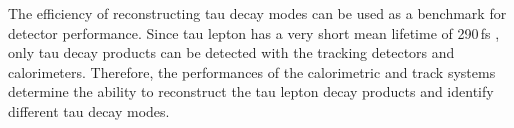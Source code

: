 The efficiency of reconstructing tau decay modes can be used as a benchmark for detector performance. Since tau lepton has a very short mean lifetime of 290\,fs \cite{Abreu:1991jn}, only tau decay products can be detected with the tracking detectors and calorimeters. Therefore, the performances of the calorimetric and track systems determine the ability to reconstruct the tau lepton decay products and identify different tau decay modes.

